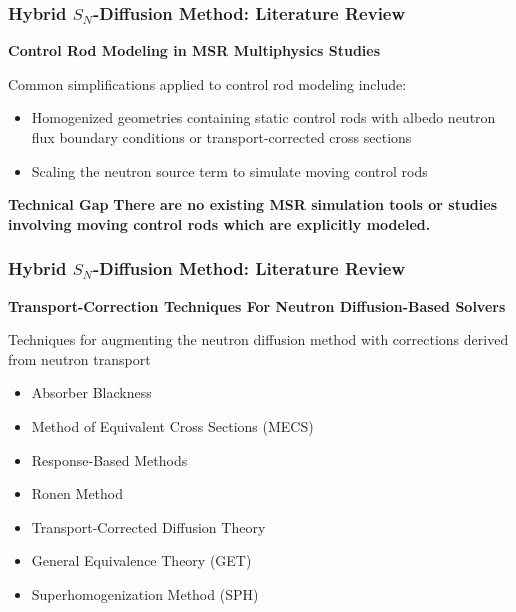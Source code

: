 \begin{frame}
  \frametitle{Hybrid $S_N$-Diffusion Method: Literature Review}
  \textbf{Control Rod Modeling in MSR Multiphysics Studies}

  Common simplifications applied to control rod modeling include:
  \begin{itemize}
    \item Homogenized geometries containing static control rods with albedo neutron flux boundary
      conditions \cite{kophazi_development_2009} or transport-corrected cross sections
      \cite{cui_development_2021, jaradat_development_2021, yang_development_2022}
    \item Scaling the neutron source term to simulate moving control rods
      \cite{delpech_benchmark_2003, krepel_dyn3d-msr_2007, jaradat_development_2021,
      yang_development_2022}
  \end{itemize}

  \begin{block}{\textbf{Technical Gap}}
    \textbf{There are no existing MSR simulation tools or studies involving moving control rods
    which are explicitly modeled.}
  \end{block}
\end{frame}

\begin{frame}
  \frametitle{Hybrid $S_N$-Diffusion Method: Literature Review}
  \textbf{Transport-Correction Techniques For Neutron Diffusion-Based Solvers}
  \vspace{.3cm}

  Techniques for augmenting the neutron diffusion method with corrections derived from neutron
  transport
  \begin{itemize}
    \item Absorber Blackness
    \item Method of Equivalent Cross Sections (MECS)
    \item Response-Based Methods
    \item Ronen Method
    \item Transport-Corrected Diffusion Theory
    \item General Equivalence Theory (GET)
    \item Superhomogenization Method (SPH)
  \end{itemize}
\end{frame}

